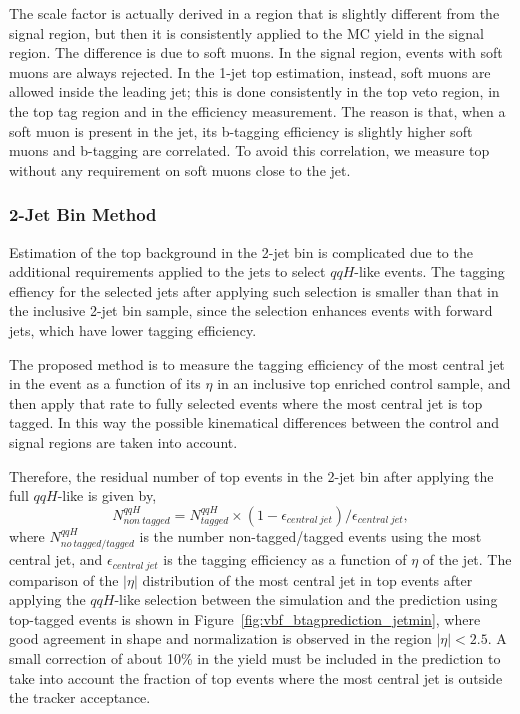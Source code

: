The scale factor is actually derived in a region that is slightly different from the signal region, 
but then it is consistently applied to the MC yield in the signal region.
The difference is due to soft muons. In the signal region, events with soft muons are always rejected.
In the 1-jet top estimation, instead, soft muons are allowed inside the leading jet; 
this is done consistently in the top veto region, in the top tag region and in the efficiency measurement.
The reason is that, when a soft muon is present in the jet, its b-tagging efficiency is slightly higher
soft muons and b-tagging are correlated. To avoid this correlation, we measure top without any requirement 
on soft muons close to the jet.

%
% 
\subsubsection{2-Jet Bin Method}
Estimation of the top background in the 2-jet bin is complicated due to 
the additional requirements applied to the jets to
select $qqH$-like events. The tagging effiency for the selected jets 
after applying such selection is smaller than that in the inclusive 
2-jet bin sample, since the selection enhances events with forward 
jets, which have lower tagging efficiency.

The proposed method is to measure the tagging efficiency of the most central 
jet in the event as a function of its $\eta$ in an inclusive top 
enriched control sample, and then apply that rate to fully selected events 
where the most central jet is top tagged. In this way the 
possible kinematical differences between the control and signal regions 
are taken into account.

Therefore, the residual number of top events in the 2-jet bin after applying the full 
$qqH$-like is given by,
$${N_{non~tagged}^{qqH} = N_{tagged}^{qqH} \times (1-\epsilon_{central~jet})/\epsilon_{central~jet}},$$
where $N_{no~tagged/tagged}^{qqH}$ is the number non-tagged/tagged events using 
the most central jet, and $\epsilon_{central~jet}$ is the 
tagging efficiency as a function of $\eta$ of the jet. The comparison of the 
$|\eta|$ distribution of the most central jet in top events after applying the $qqH$-like selection between the simulation and 
the prediction using top-tagged events is shown in Figure~\ref{fig:vbf_btagprediction_jetmin}, where 
good agreement in shape and normalization is observed in the region $|\eta|<2.5$. A small correction 
of about 10\% in the yield must be included in the prediction to take into account the fraction 
of top events where the most central jet is outside the tracker acceptance.

